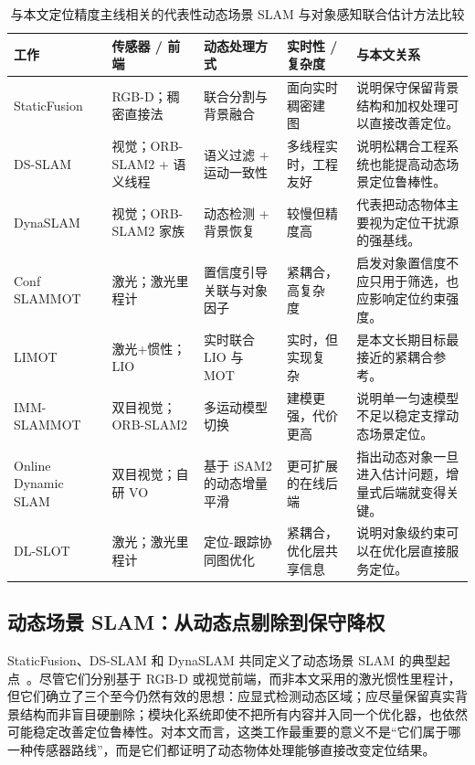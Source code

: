 \documentclass[utf8, a4paper, 12pt]{ctexart}
\begin{document}
\begin{table}[H]
    \centering
    \caption{与本文定位精度主线相关的代表性动态场景 SLAM 与对象感知联合估计方法比较}
    \label{tab:slammot_related_work}
    \footnotesize
    \begin{tabularx}{\textwidth}{p{2.0cm} p{2.5cm} p{2.8cm} p{2.0cm} X}
        \toprule
        工作 & 传感器 / 前端 & 动态处理方式 & 实时性 / 复杂度 & 与本文关系 \\
        \midrule
        StaticFusion & RGB-D；稠密直接法 & 联合分割与背景融合 & 面向实时稠密建图~\cite{staticfusion} & 说明保守保留背景结构和加权处理可以直接改善定位。 \\
        DS-SLAM & 视觉；ORB-SLAM2 + 语义线程 & 语义过滤 + 运动一致性 & 多线程实时，工程友好~\cite{ds-slam} & 说明松耦合工程系统也能提高动态场景定位鲁棒性。 \\
        DynaSLAM & 视觉；ORB-SLAM2 家族 & 动态检测 + 背景恢复 & 较慢但精度高~\cite{dynaslam} & 代表把动态物体主要视为定位干扰源的强基线。 \\
        Conf SLAMMOT & 激光；激光里程计 & 置信度引导关联与对象因子 & 紧耦合，高复杂度~\cite{confslammot} & 启发对象置信度不应只用于筛选，也应影响定位约束强度。 \\
        LIMOT & 激光+惯性；LIO & 实时联合 LIO 与 MOT & 实时，但实现复杂~\cite{limot} & 是本文长期目标最接近的紧耦合参考。 \\
        IMM-SLAMMOT & 双目视觉；ORB-SLAM2 & 多运动模型切换 & 建模更强，代价更高~\cite{imm-slammot} & 说明单一匀速模型不足以稳定支撑动态场景定位。 \\
        Online Dynamic SLAM & 双目视觉；自研 VO & 基于 iSAM2 的动态增量平滑 & 更可扩展的在线后端~\cite{online-dynamic-slam} & 指出动态对象一旦进入估计问题，增量式后端就变得关键。 \\
        DL-SLOT & 激光；激光里程计 & 定位-跟踪协同图优化 & 紧耦合，优化层共享信息~\cite{dl-slot} & 说明对象级约束可以在优化层直接服务定位。 \\
        \bottomrule
    \end{tabularx}
\end{table}

\subsection{动态场景 SLAM：从动态点剔除到保守降权}
StaticFusion、DS-SLAM 和 DynaSLAM 共同定义了动态场景 SLAM 的典型起点~\cite{staticfusion,ds-slam,dynaslam}。尽管它们分别基于 RGB-D 或视觉前端，而非本文采用的激光惯性里程计，但它们确立了三个至今仍然有效的思想：应显式检测动态区域；应尽量保留真实背景结构而非盲目硬删除；模块化系统即使不把所有内容并入同一个优化器，也依然可能稳定改善定位鲁棒性。对本文而言，这类工作最重要的意义不是“它们属于哪一种传感器路线”，而是它们都证明了动态物体处理能够直接改变定位结果。
\end{document}
